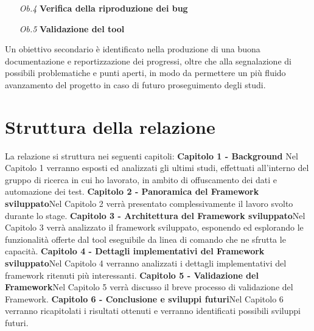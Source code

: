 \begin{enumerate}[nosep]
\begin{description}[nosep]
   		 \end{description}
   \item[\emph{Ob.4}]  \textbf{Verifica della riproduzione dei bug}
   \item[\emph{Ob.5}] \textbf{Validazione del tool}
\end{enumerate}

Un obiettivo secondario è identificato nella produzione di una buona documentazione e reportizzazione dei progressi, oltre che alla segnalazione di possibili problematiche e punti aperti, in modo da permettere un più fluido avanzamento del progetto in caso di futuro proseguimento degli studi.


\clearpage
\section*{Struttura della relazione}


La relazione si struttura nei seguenti capitoli:
\bigbreak
 \noindent\textbf{Capitolo 1 - Background} \newline Nel Capitolo 1 verranno esposti ed analizzati gli ultimi studi, effettuati all'interno del gruppo di ricerca in cui ho lavorato, in ambito di offuscamento dei dati e automazione dei test.
\bigbreak
 \noindent\textbf{Capitolo 2 - Panoramica del Framework sviluppato}\newline Nel Capitolo 2 verrà presentato complessivamente il lavoro svolto durante lo stage.
\bigbreak
 \noindent\textbf{Capitolo 3 - Architettura del Framework sviluppato}\newline Nel Capitolo 3 verrà analizzato il framework sviluppato, esponendo ed esplorando le funzionalità offerte dal tool eseguibile da linea di comando che ne sfrutta le capacità.
\bigbreak  
 \noindent\textbf{Capitolo 4 - Dettagli implementativi del Framework sviluppato}\newline Nel Capitolo 4 verranno analizzati i dettagli implementativi del framework ritenuti più interessanti.
\bigbreak   
 \noindent\textbf{Capitolo 5 - Validazione del Framework}\newline Nel Capitolo 5 verrà discusso il breve processo di validazione del Framework.
\bigbreak   
\noindent\textbf{Capitolo 6 - Conclusione e sviluppi futuri}\newline Nel Capitolo 6 verranno ricapitolati i risultati ottenuti e verranno identificati possibili sviluppi futuri.
      
